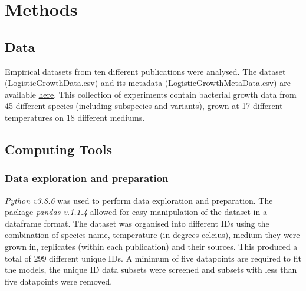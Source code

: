 \documentclass[11pt, a4paper, titlepage]{article}
\begin{document}
\section{Methods}

\subsection{Data}
Empirical datasets from ten different publications were analysed. The dataset (LogisticGrowthData.csv) and its metadata (LogisticGrowthMetaData.csv) are available \href{https://github.com/mhasoba/TheMulQuaBio/tree/master/content/data}{here}. This collection of experiments contain bacterial growth data from 45 different species (including subspecies and variants), grown at 17 different temperatures on 18 different mediums.

\subsection{Computing Tools}

\subsubsection{Data exploration and preparation}
\emph{Python v3.8.6} was used to perform data exploration and preparation. The package \emph{pandas v.1.1.4} allowed for easy manipulation of the dataset in a dataframe format. The dataset was organised into different IDs using the combination of species name, temperature (in degrees celcius), medium they were grown in, replicates (within each publication) and their sources. This produced a total of 299 different unique IDs. A minimum of five datapoints are required to fit the models, the unique ID data subsets were screened and subsets with less than five datapoints were removed.
\end{document}
